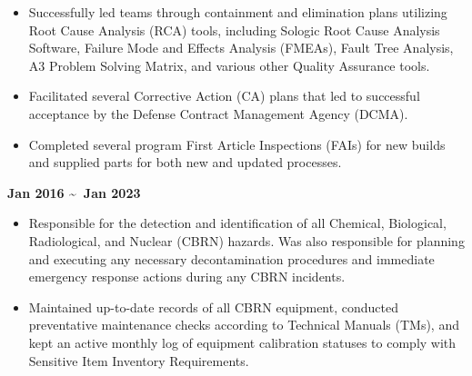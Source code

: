 \documentclass[AutoFakeBold]{resume}
\begin{document}
\begin{itemize}
    \item Successfully led teams through containment and elimination plans utilizing Root Cause Analysis (RCA) tools, including Sologic Root Cause Analysis Software, Failure Mode and Effects Analysis (FMEAs), Fault Tree Analysis, A3 Problem Solving Matrix, and various other Quality Assurance tools.
    \item Facilitated several Corrective Action (CA) plans that led to successful acceptance by the Defense Contract Management Agency (DCMA).
    \item Completed several program First Article Inspections (FAIs) for new builds and supplied parts for both new and updated processes.
\end{itemize}  
\newpage
\vspace{5mm}
 {\textbf{Jan 2016 \textasciitilde \ Jan 2023}}
\begin{itemize}
    \item Responsible for the detection and identification of all Chemical, Biological, Radiological, and Nuclear (CBRN) hazards. Was also responsible for planning and executing any necessary decontamination procedures and immediate emergency response actions during any CBRN incidents.
    \item Maintained up-to-date records of all CBRN equipment, conducted preventative maintenance checks according to Technical Manuals (TMs), and kept an active monthly log of equipment calibration statuses to comply with Sensitive Item Inventory Requirements.
\end{itemize}
\vspace{5mm}
\end{document}
